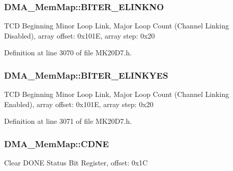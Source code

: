 \subsubsection[{\texorpdfstring{B\+I\+T\+E\+R\+\_\+\+E\+L\+I\+N\+K\+NO}{BITER_ELINKNO}}]{ D\+M\+A\+\_\+\+Mem\+Map\+::\+B\+I\+T\+E\+R\+\_\+\+E\+L\+I\+N\+K\+NO}\hypertarget{struct_d_m_a___mem_map_ab5a88bd570bf66e4186b2363c84bd015}{}\label{struct_d_m_a___mem_map_ab5a88bd570bf66e4186b2363c84bd015}
T\+CD Beginning Minor Loop Link, Major Loop Count (Channel Linking Disabled), array offset\+: 0x101E, array step\+: 0x20 

Definition at line 3070 of file M\+K20\+D7.\+h.

\subsubsection[{\texorpdfstring{B\+I\+T\+E\+R\+\_\+\+E\+L\+I\+N\+K\+Y\+ES}{BITER_ELINKYES}}]{ D\+M\+A\+\_\+\+Mem\+Map\+::\+B\+I\+T\+E\+R\+\_\+\+E\+L\+I\+N\+K\+Y\+ES}\hypertarget{struct_d_m_a___mem_map_a352e7d2300de3264c6a49f1ce813e149}{}\label{struct_d_m_a___mem_map_a352e7d2300de3264c6a49f1ce813e149}
T\+CD Beginning Minor Loop Link, Major Loop Count (Channel Linking Enabled), array offset\+: 0x101E, array step\+: 0x20 

Definition at line 3071 of file M\+K20\+D7.\+h.

\subsubsection[{\texorpdfstring{C\+D\+NE}{CDNE}}]{ D\+M\+A\+\_\+\+Mem\+Map\+::\+C\+D\+NE}\hypertarget{struct_d_m_a___mem_map_ab41bdc9f4302f141db34641e6cf21e85}{}\label{struct_d_m_a___mem_map_ab41bdc9f4302f141db34641e6cf21e85}
Clear D\+O\+NE Status Bit Register, offset\+: 0x1C 

